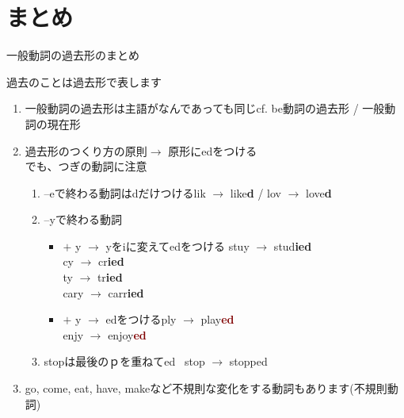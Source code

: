 \documentclass[aspectratio=169,xcolor={dvipsnames,table}]{beamer}
\begin{document}
\section{まとめ}
\begin{frame}[plain]{一般動詞の過去形のまとめ}
 \begin{alertblock}{過去のことは過去形で表します}\small
\pause
\begin{enumerate}
 \item 一般動詞の過去形は主語がなんであっても同じ\hfill{}{\scriptsize cf. be動詞の過去形 / 一般動詞の現在形}\pause
 \item 過去形のつくり方の原則$\longrightarrow$ 原形にedをつける\\\pause
でも、つぎの動詞に注意\pause
       \begin{enumerate}
	\item --eで終わる動詞はdだけつける\hfill{}lik $\rightarrow$ like\textcolor{OliveGreen}{\bfseries d} / lov $\rightarrow$ love\textcolor{OliveGreen}{\bfseries d}\pause
	\item --yで終わる動詞\pause
\begin{itemize}
	         \item {} $+$ y $\longrightarrow$ yをiに変えてedをつける%
\hfill{}stuy $\rightarrow$ stud\textcolor{NavyBlue}{\bfseries ied}\\
\hfill{}cy $\rightarrow$ cr\textcolor{NavyBlue}{\bfseries ied}\\
\hfill{}ty $\rightarrow$ tr\textcolor{NavyBlue}{\bfseries ied}\\
\hfill{}cary $\rightarrow$ carr\textcolor{NavyBlue}{\bfseries ied}\pause
  \item {} $+$ y $\longrightarrow$ edをつける\hfill{}ply $\rightarrow$ play\textcolor{Maroon}{\bfseries ed}\\
\hfill{}enjy $\rightarrow$ enjoy\textcolor{Maroon}{\bfseries ed}\pause
	      \end{itemize}
	\item stopは最後のｐを重ねてed\,\,\,\,\,stop $\longrightarrow$ stopped
       \end{enumerate}\pause
 \item go, come, eat, have, makeなど不規則な変化をする動詞もあります(不規則動詞)
\end{enumerate}

\end{alertblock}

\end{frame}
\end{document}
